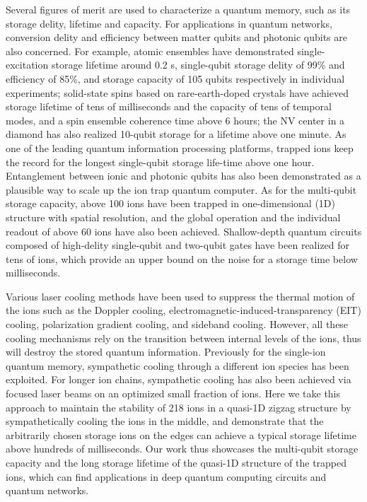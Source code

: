 Several figures of merit are used to characterize a quantum memory, such as its storage delity, lifetime and capacity. For applications in quantum networks, conversion delity and efficiency between matter qubits and photonic qubits are also concerned. For example, atomic ensembles have demonstrated single-excitation storage lifetime around 0.2 s, single-qubit storage delity of 99\% and efficiency of 85\%, and storage capacity of 105 qubits respectively in individual experiments; solid-state spins based on rare-earth-doped crystals have achieved storage lifetime of tens of milliseconds and the capacity of tens of temporal modes, and a spin ensemble coherence time above 6 hours; the NV center in a diamond has also realized 10-qubit storage for a lifetime above one minute. As one of the leading quantum information processing platforms, trapped ions keep the record for the longest single-qubit storage life-time above one hour. Entanglement between ionic and photonic qubits has also been demonstrated as a plausible way to scale up the ion trap quantum computer. As for the multi-qubit storage capacity, above 100 ions have been trapped in one-dimensional (1D) structure with spatial resolution, and the global operation and the individual readout of above 60 ions have also been achieved. Shallow-depth quantum circuits composed of high-delity single-qubit and two-qubit gates have been realized for tens of ions, which provide an upper bound on the noise for a storage time below milliseconds.

Various laser cooling methods have been used to suppress the thermal motion of the ions such as the Doppler cooling, electromagnetic-induced-transparency (EIT) cooling, polarization gradient cooling, and sideband cooling. However, all these cooling mechanisms rely on the transition between internal levels of the ions, thus will destroy the stored quantum information. Previously for the single-ion quantum memory, sympathetic cooling through a different ion species has been exploited. For longer ion chains, sympathetic cooling has also been achieved via focused laser beams on an optimized small fraction of ions. Here we take this approach to maintain the stability of 218 ions in a quasi-1D zigzag structure by sympathetically cooling the ions in the middle, and demonstrate that the arbitrarily chosen storage ions on the edges can achieve a typical storage lifetime above hundreds of milliseconds. Our work thus showcases the multi-qubit storage capacity and the long storage lifetime of the quasi-1D structure of the trapped ions, which can find applications in deep quantum computing circuits and quantum networks.
